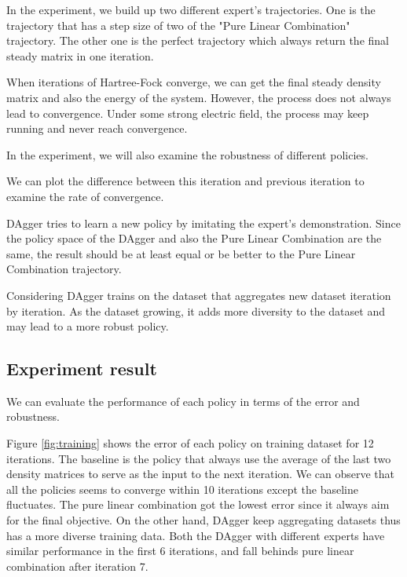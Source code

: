 \documentclass[twoside]{article}
\begin{document}
In the experiment, we build up two different expert's trajectories. 
One is the trajectory that has a step size of two of the "Pure Linear Combination" trajectory. The other one is the perfect trajectory which always return the final steady matrix in one iteration.


When iterations of Hartree-Fock converge, we can get the final steady density matrix and also the energy of the system. However, the process does not always lead to convergence. Under some strong electric field, the process may keep running and never reach convergence.

 In the experiment, we will also examine the robustness of different policies.


We can plot the difference between this iteration and previous iteration to examine the rate of convergence.


DAgger tries to learn a new policy by imitating the expert's demonstration. Since the policy space of the DAgger and also the Pure Linear Combination are the same, the result should be at least equal or be better to the Pure Linear Combination trajectory. 
 
Considering DAgger trains on the dataset that aggregates new dataset iteration by iteration. As the dataset growing, it adds more diversity to the dataset and may lead to a more robust policy.

\subsection{Experiment result}


We can evaluate the performance of each policy in terms of the error and robustness. 

Figure \ref{fig:training} shows the error of each policy on training dataset for 12 iterations. The baseline is the policy that always use the average of the last two density matrices to serve as the input to the next iteration.  We can observe that all the policies seems to  converge within 10 iterations except the baseline fluctuates. The pure linear combination got the lowest error since it always aim for the final objective. On the other hand, DAgger keep aggregating datasets thus has a more diverse training data. Both the DAgger with different experts have similar performance in the first 6 iterations, and fall behinds pure linear combination after iteration 7. 
\end{document}
